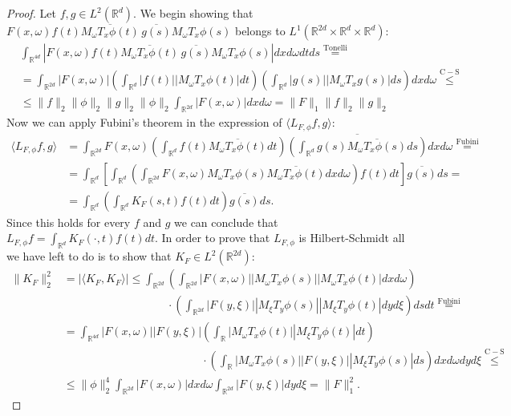 \documentclass[corpo=11pt, stile=classica, tipotesi=custom,
greek, evenboxes, english]{toptesi}
\numberwithin{equation}{chapter}
\theoremstyle{remark}
\newcommand{\R}{\mathbb{R}} %
\begin{document}
\begin{proof}
		Let $f,g \in L^2(\R^d)$. We begin showing that $F(x,\omega) f(t) \overline{M_{\omega}T_{x} \phi(t)} \, \overline{g(s)}M_{\omega}T_x \phi(s)$ belongs to $L^1(\R^{2d} \times \R^d \times \R^d)$:
	\begin{align*}
		&\int_{\R^{4d}} |F(x,\omega) f(t) \overline{M_{\omega}T_{x} \phi(t)} \, \overline{g(s)}M_{\omega}T_x \phi(s)| dx d\omega dt ds \overset{\mathrm{Tonelli}}{=}\\
		&= \int_{\R^{2d}} |F(x,\omega)|\left( \int_{\R^d} |f(t)| |M_{\omega}T_x \phi(t)|dt\right) \left( \int_{\R^d} |g(s)| |M_{\omega}T_x g(s)|ds\right)dx d\omega \overset{\mathrm{C-S}}{\leq} \\
		&\leq \|f\|_2 \|\phi\|_2 \|g\|_2 \|\phi\|_2 \int_{\R^{2d}} |F(x,\omega)|dx d\omega = \|F\|_1 \|f\|_2 \|g\|_2
	\end{align*}
	Now we can apply Fubini's theorem in the expression of $\langle L_{F,\phi}f,g\rangle$:
	\begin{align*}
		\langle L_{F,\phi}f,g \rangle &= \int_{\R^{2d}} F(x,\omega) \left(\int_{\R^d} f(t) \overline{M_{\omega}T_x \phi(t)}dt\right) \overline{\left(\int_{\R^d} g(s) \overline{M_{\omega}T_x \phi(s)}ds\right)} dx d\omega \overset{\mathrm{Fubini}}{=} \\
									  &= \int_{\R^d} \left[\int_{\R^d}\left( \int_{\R^{2d}} F(x,\omega) M_{\omega}T_x \phi(s) \overline{M_{\omega} T_x \phi(t)} dx d\omega \right) f(t) dt\right] \overline{g(s)}ds = \\
									  &= \int_{\R^d} \left(\int_{\R^d} K_F(s,t) f(t)dt\right) \overline{g(s)} ds.
	\end{align*}
	Since this holds for every $f$ and $g$ we can conclude that $L_{F,\phi} f = \int_{\R^d} K_F(\cdot,t) f(t)dt $. In order to prove that $L_{F,\phi}$ is Hilbert-Schmidt all we have left to do is to show that $K_F \in L^2(\R^{2d})$:
	\begin{align*}
		\|K_F\|_2^2 &= | \langle K_F, K_F \rangle |\leq \int_{\R^{2d}} \left( \int_{\R^{2d}} |F(x,\omega)| |M_{\omega}T_x \phi(s)| |M_{\omega} T_x \phi(t)| dx d\omega\right)\\
					&\phantom{=| \langle K_F, K_F \rangle |\leq \int_{\R^{2d}}} \! {\cdot} \left(\int_{\R^{2d}} |F(y,\xi)| |M_{\xi}T_y \phi(s)| |M_{\xi} T_y \phi(t)| dy d\xi\right) ds dt \overset{\mathrm{Fubini}}{=} \\
					&= \int_{\R^{4d}} |F(x,\omega)| |F(y,\xi)| \left(\int_{\R} |M_{\omega} T_x \phi(t)| |M_{\xi} T_y \phi(t)| dt\right) \\
					&\phantom{= \int_{\R^{4d}} |F(x,\omega)| |F(y,\xi)|} \!\cdot\left(\int_{\R} |M_{\omega}T_x \phi(s)| |F(y,\xi)| |M_{\xi}T_y \phi(s)| ds\right) dx d\omega dy d\xi \overset{\mathrm{C-S}}{\leq}\\
					& \leq \|\phi\|_2^4 \int_{\R^{2d}} |F(x,\omega)| dx d\omega \int_{\R^{2d}} |F(y,\xi)| dy d\xi = \|F\|_1^2.
	\end{align*}
\end{proof}
\end{document}

